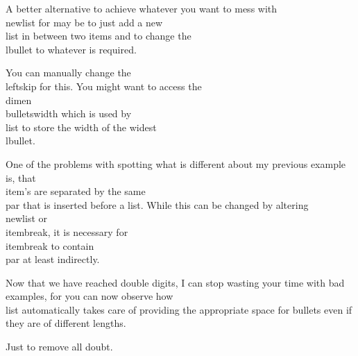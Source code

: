 {{  \item{A better alternative to achieve whatever you want to mess with {\cs\\newlist} for may be to just add a new {\cs\\list} in between two items and to change the {\cs\\lbullet} to whatever is required.}
  \item{You can manually change the {\cs\\leftskip} for this. You might want to access the {\cs\\dimen} {\cs\\bulletswidth} which is used by {\cs\\list} to store the width of the widest {\cs\\lbullet}.}
  {\advance\leftskip\bulletswidth{}}
  \item{One of the problems with spotting what is different about my previous example is, that {\cs\\item}'s are separated by the same {\cs\\par} that is inserted before a list. While this can be changed by altering {\cs\\newlist} or {\cs\\itembreak}, it is necessary for {\cs\\itembreak} to contain {\cs\\par} at least indirectly.}
  \item{Now that we have reached double digits, I can stop wasting your time with bad examples, for you can now observe how {\cs\\list} automatically takes care of providing the appropriate space for bullets even if they are of different lengths.}
  {\def\lbullet{$\circ\quad$}
  \item{Just to remove all doubt.}}}}
